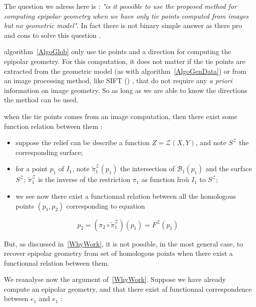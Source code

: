 \documentclass{ipol}
\newcommand{\Bund}[1]{\ensuremath{\mathcal{B}_{#1}}}
\newcommand{\BundO}{\Bund{1}}
\newcommand{\PiZVert}{\widetilde{\pi}_1^{\mathcal{Z}} }
\begin{document}
The question we adress here is : \emph{"is it possible to use
the proposed method  for computing epipolar geometry
when we have only  tie points computed from images but no geometric model"}.  In fact
there is not binary simple answer as there pro and cons to solve this question .

  algorithm~\ref{AlgoGlob} only use tie points and a
direction for computing the epipolar geometry. For this computation,
it does not matter if the tie points are extracted from the geometric model
(as with algorithm~\ref{AlgoGenData}) or from an image 
processing method, like SIFT (\cite{LOWE}) , that do not require any
\emph{a priori} information on image geometry. So as long as we
are able to know the directions the method can be used.


 when the tie points comes from an image computation,
then there exist some function relation between them :

\begin{itemize}
   \item suppose the relief can be describe a function $Z=\mathcal{Z}(X,Y)$,
         and note $S^\mathcal{Z}$  the corresponding surface;
   \item for a point $p_1$ of $I_1$, note $ \PiZVert (p_1)$
         the intersection of  $\BundO(p_1)$ and the surface  $S^\mathcal{Z}$;
         $\PiZVert$ is the inverse of the restriction  $\pi_1$ 
         as function froù $I_1$ to $S^\mathcal{Z}$;

   \item we see now there exist a functionnal relation between all the homologous
         points $(p_1,p_2)$ corresponding to equation 
\end{itemize}

\begin{equation}
   p_2 = (\pi_2 \circ  \PiZVert) (p_1) = F^\mathcal{Z}(p_1)
\end{equation}


But, as discussed in~\ref{WhyWork}, it is not possible, in the most general
case, to recover epipolar geometry from set of homologous points when there exist
a functionnal relation between them.

 We reanalyse now the argument of~\ref{WhyWork}.
Suppose we have already compute an epipolar geometry, and that there exist af functionnal
correspondence between $e_1$ and $e_1$ :
\end{document}
